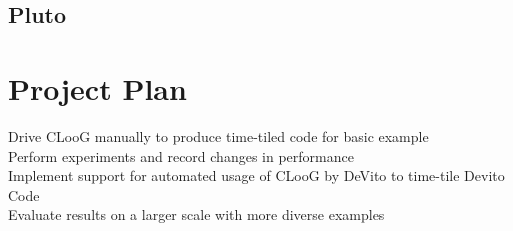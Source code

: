 \documentclass[a4paper,12pt,twoside]{report}
\begin{document}
\section{Pluto}



\chapter{Project Plan}
Drive CLooG manually to produce time-tiled code for basic example \\
Perform experiments and record changes in performance \\
Implement support for automated usage of CLooG by DeVito to time-tile Devito Code \\
Evaluate results on a larger scale with more diverse examples




\end{document}

